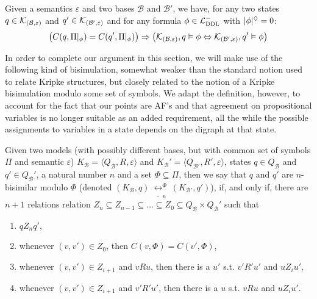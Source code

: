 \documentclass{llncs}
\newcommand{\comp}[2]{C(#1,#2)}
\newcommand{\dlangm}{{\mathcal L}_{\acro{DDL}}^{-}}
\newcommand{\carriers}[1]{Q_{#1}}
\newcommand{\kmod}[2]{{\cal K}_{(#1,#2)}}
\newcommand{\views}{\mathcal B}
\newcommand{\carrier}{Q_\views}
\newcommand{\sem}{\varepsilon}
\newcommand{\depth}[1]{|{#1}|^\adia}
\newcommand{\bisim}{\underline{\leftrightarrow}}
\begin{document}

\begin{lemma}\label{lemma:comp}Given a semantics $\sem$ and two bases $\views$ and $\views'$, we have, for any two states $q \in \kmod \views \sem$ and $q' \in \kmod {\views'} \sem$ and for any formula $\phi \in \dlangm$ with $\depth \phi = 0$:
$$
\big(\comp q {\restr \Pi \phi} = \comp {q'} {\restr \Pi \phi}\big) \Rightarrow \big(\kmod \views \sem,q \vDash \phi \Leftrightarrow \kmod {\views'} \sem, q'  \vDash \phi \big)$$
\end{lemma}

In order to complete our argument in this section, we will make use of the following kind of bisimulation,  somewhat weaker than the standard notion used to relate Kripke structures, but closely related to the notion of a Kripke bisimulation modulo some set of symbols. We adapt the definition, however, to account for the fact that our points are AF's and that agreement on propositional variables is no longer suitable as an added requirement, all the while the possible assignments to variables in a state depends on the digraph at that state.

\begin{definition}\label{def:bisim} Given two models (with possibly different bases, but with common set of symbols $\Pi$ and semantic $\sem$) $K_\views = \langle \carriers \views, R, \sem \rangle$ and $K_\views' = \langle \carriers {\views'}, R', \sem\rangle$, states $q \in \carrier$ and $q' \in \carrier'$, a natural number $n$ and a set $\Phi \subseteq \Pi$, then we say that $q$ and $q'$ are $n$-bisimilar modulo $\Phi$ (denoted $(K_\views, q) ~ \bisim_n^\Phi~ (K_{\views'}, q')$), if, and only if, there are $n+1$ relations relation $Z_n \subseteq Z_{n-1} \subseteq \dots \subseteq Z_0 \subseteq \carrier \times \carrier'$ such that
\begin{enumerate}
\item $q Z_n q'$, 
\item whenever $(v, v') \in Z_0$, then $C(v, \Phi) = C(v', \Phi)$, 
\item whenever $(v, v') \in Z_{i+1}$ and $vRu$, then there is a $u'$ s.t. $v'R'u'$ and $uZ_{i}u'$, 
\item whenever $(v, v') \in Z_{i+1}$ and $v'R'u'$, then there is a $u$ s.t. $vRu$ and $uZ_i u'$.
\end{enumerate}
\end{definition}
\end{document}
